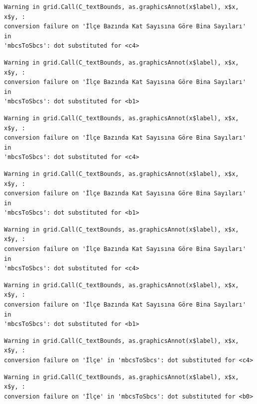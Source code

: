 \documentclass[
  11pt,
  a4paper,
  DIV=11,
  numbers=noendperiod]{scrartcl}
\begin{document}
\begin{verbatim}
Warning in grid.Call(C_textBounds, as.graphicsAnnot(x$label), x$x, x$y, :
conversion failure on 'İlçe Bazında Kat Sayısına Göre Bina Sayıları' in
'mbcsToSbcs': dot substituted for <c4>
\end{verbatim}

\begin{verbatim}
Warning in grid.Call(C_textBounds, as.graphicsAnnot(x$label), x$x, x$y, :
conversion failure on 'İlçe Bazında Kat Sayısına Göre Bina Sayıları' in
'mbcsToSbcs': dot substituted for <b1>
\end{verbatim}

\begin{verbatim}
Warning in grid.Call(C_textBounds, as.graphicsAnnot(x$label), x$x, x$y, :
conversion failure on 'İlçe Bazında Kat Sayısına Göre Bina Sayıları' in
'mbcsToSbcs': dot substituted for <c4>
\end{verbatim}

\begin{verbatim}
Warning in grid.Call(C_textBounds, as.graphicsAnnot(x$label), x$x, x$y, :
conversion failure on 'İlçe Bazında Kat Sayısına Göre Bina Sayıları' in
'mbcsToSbcs': dot substituted for <b1>
\end{verbatim}

\begin{verbatim}
Warning in grid.Call(C_textBounds, as.graphicsAnnot(x$label), x$x, x$y, :
conversion failure on 'İlçe Bazında Kat Sayısına Göre Bina Sayıları' in
'mbcsToSbcs': dot substituted for <c4>
\end{verbatim}

\begin{verbatim}
Warning in grid.Call(C_textBounds, as.graphicsAnnot(x$label), x$x, x$y, :
conversion failure on 'İlçe Bazında Kat Sayısına Göre Bina Sayıları' in
'mbcsToSbcs': dot substituted for <b1>
\end{verbatim}

\begin{verbatim}
Warning in grid.Call(C_textBounds, as.graphicsAnnot(x$label), x$x, x$y, :
conversion failure on 'İlçe' in 'mbcsToSbcs': dot substituted for <c4>
\end{verbatim}

\begin{verbatim}
Warning in grid.Call(C_textBounds, as.graphicsAnnot(x$label), x$x, x$y, :
conversion failure on 'İlçe' in 'mbcsToSbcs': dot substituted for <b0>
\end{verbatim}
\end{document}

